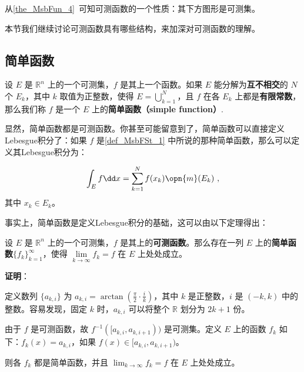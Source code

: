 

从\autoref{the_MsbFun_4}~可知可测函数的一个性质：其下方图形是可测集。

本节我们继续讨论可测函数具有哪些结构，来加深对可测函数的理解。

\subsection{简单函数}

\begin{definition}{}\label{def_MsbFSt_1}
设 $E$ 是 $\mathbb{R}^n$ 上的一个可测集，$f$ 是其上一个函数。如果 $E$ 能分解为\textbf{互不相交}的 $N$ 个 $E_k$，其中 $k$ 取值为正整数，使得 $E=\bigcup_{k=1}^N$，且 $f$ 在各 $E_k$ 上都是\textbf{有限常数}，那么我们称 $f$ 是一个 $E$ 上的\textbf{简单函数（simple function）}.
\end{definition}

显然，简单函数都是可测函数。你甚至可能留意到了，简单函数可以直接定义Lebesgue积分了：如果 $f$ 是\autoref{def_MsbFSt_1} 中所说的那种简单函数，那么可以定义其Lebesgue积分为：

\begin{equation}\label{eq_MsbFSt_1}
\int_E f \dd x = \sum_{k=1}^N f(x_k) \opn{m}(E_k)~,
\end{equation}
其中 $x_k\in E_k$。

事实上，简单函数是定义Lebesgue积分的基础，这可以由以下定理得出：

\begin{theorem}{}\label{the_MsbFSt_1}
设 $E$ 是 $\mathbb{R}^n$ 上的一个可测集，$f$ 是其上的\textbf{可测函数}。那么存在一列 $E$ 上的\textbf{简单函数}$\{f_k\}_{k=1}^\infty$，使得 $\lim\limits_{k\to\infty}f_k=f$ 在 $E$ 上处处成立。
\end{theorem}

\textbf{证明}：

定义数列 $\{a_{k, i}\}$ 为 $a_{k, i}=\arctan(\frac{\pi}{2}\cdot\frac{i}{k})$，其中 $k$ 是正整数，$i$ 是 $(-k, k)$ 中的整数。容易发现，固定 $k$ 时，$a_{k, i}$ 可以将整个 $\mathbb{R}$ 划分为 $2k+1$ 份。

由于 $f$ 是可测函数，故 $f^{-1}([a_{k, i}, a_{k, i+1}))$ 是可测集。定义 $E$ 上的函数 $f_k$ 如下：$f_k(x)=a_{k, i}$，如果 $f(x)\in [a_{k, i}, a_{k, i+1})$。

则各 $f_k$ 都是简单函数，并且 $\lim_{k\to\infty}f_k=f$ 在 $E$ 上处处成立。

